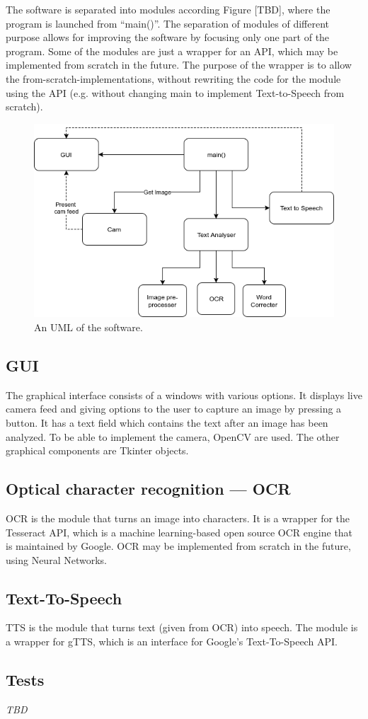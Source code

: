 \documentclass[../main.tex]{subfiles}
\begin{document}
The software is separated into modules according Figure [TBD], where the
program is launched from “main()”. The separation of modules of different
purpose allows for improving the software by focusing only one part of the
program. Some of the modules are just a wrapper for an API, which may be
implemented from scratch in the future. The purpose of the wrapper is to allow
the from-scratch-implementations, without rewriting the code for the module
using the API (e.g. without changing main to implement Text-to-Speech from
scratch).

\begin{figure}[h]
  \centering
  \caption{An UML of the software.\label{fig:main_uml}}
  \includegraphics[width=1.0\textwidth]{res/UML1}
\end{figure}

\subsection{GUI}
The graphical interface consists of a windows with various options. It
displays live camera feed and giving options to the user to capture an image
by pressing a button. It has a text field which contains the text after an
image has been analyzed. To be able to implement the camera, OpenCV are used.
The other graphical components are Tkinter objects.

\subsection{Optical character recognition --- OCR}
OCR is the module that turns an image into characters. It is a wrapper for the
Tesseract API, which is a  machine learning-based open source OCR engine that
is maintained by Google. OCR may be implemented from scratch in the future,
using Neural Networks.

\subsection{Text-To-Speech}
TTS is the module that turns text (given from OCR) into speech. The module is
a wrapper for gTTS, which is an interface for Google’s Text-To-Speech API.

\subsection{Tests}
\textit{TBD}
\end{document}
